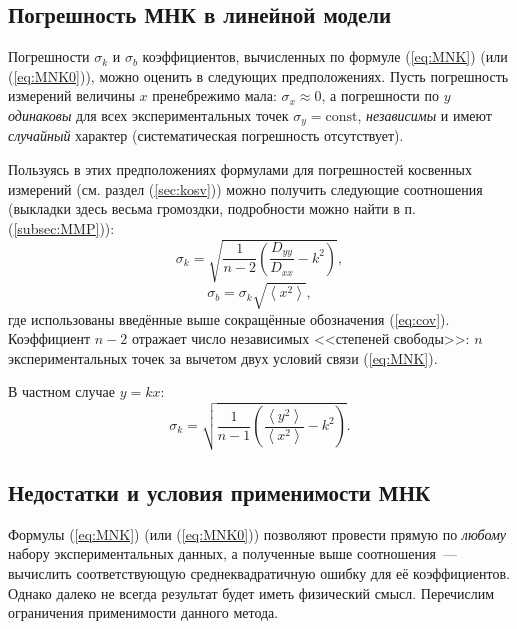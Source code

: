 \subsection{Погрешность МНК в линейной модели}\label{sec:MNKerror}

Погрешности $\sigma_{k}$ и $\sigma_{b}$ коэффициентов, вычисленных
по формуле (\ref{eq:MNK}) (или (\ref{eq:MNK0})), можно оценить в
следующих предположениях.
Пусть погрешность измерений величины $x$ пренебрежимо мала: $\sigma_{x}\approx0$,
а погрешности по $y$ \emph{одинаковы} для всех экспериментальных точек
$\sigma_{y}=\mathrm{const}$, \emph{независимы} и имеют \emph{случайный} характер
(систематическая погрешность отсутствует).

Пользуясь в этих предположениях формулами для погрешностей косвенных
измерений (см. раздел (\ref{sec:kosv})) можно получить следующие
соотношения (выкладки здесь весьма громоздки, подробности можно найти
в п. (\ref{subsec:MMP})):
\begin{equation}
\sigma_{k}=\sqrt{\frac{1}{n-2}\left(\frac{D_{yy}}{D_{xx}}-k^{2}\right)},
\label{eq:MNK_sigma_k}
\end{equation}
\begin{equation}
\sigma_{b}=\sigma_{k}\sqrt{\left\langle x^{2}\right\rangle
},\label{eq:MNK_sigma_b}
\end{equation}
где использованы введённые выше сокращённые обозначения (\ref{eq:cov}).
Коэффициент $n-2$ отражает число независимых <<степеней
свободы>>: $n$ экспериментальных точек за вычетом двух
условий связи (\ref{eq:MNK}).

В частном случае $y=kx$:
\begin{equation}
\sigma_{k}=\sqrt{\frac{1}{n-1}\left(\frac{\left\langle y^{2}\right\rangle
}{\left\langle x^{2}\right\rangle }-k^{2}\right)}.\label{eq:MNK_sigma0}
\end{equation}


\subsection{Недостатки и условия применимости МНК}\label{sec:MNKdefect}

Формулы (\ref{eq:MNK}) (или (\ref{eq:MNK0})) позволяют провести
прямую по \emph{любому} набору экспериментальных данных, а полученные
выше соотношения~--- вычислить
соответствующую среднеквадратичную ошибку для её коэффициентов. Однако
далеко не всегда результат будет иметь физический смысл. Перечислим
ограничения применимости данного метода.

